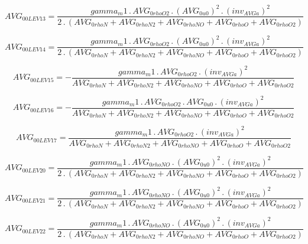 \documentclass{article}
\begin{document}
\begin{dmath}AVG_{0 0 LEV 13} = \frac{gamma_m1 \,.\, AVG_{0 rhoO2} \,.\, \left(AVG_{0 u0} \right)^{2} \,.\, \left(inv_{AVG a} \right)^{2}}{2 \,.\, \left(AVG_{0 rhoN} + AVG_{0 rhoN2} + AVG_{0 rhoNO} + AVG_{0 rhoO} + AVG_{0 rhoO2}\right)}\end{dmath}

\begin{dmath}AVG_{0 0 LEV 14} = \frac{gamma_m1 \,.\, AVG_{0 rhoO2} \,.\, \left(AVG_{0 u0} \right)^{2} \,.\, \left(inv_{AVG a} \right)^{2}}{2 \,.\, \left(AVG_{0 rhoN} + AVG_{0 rhoN2} + AVG_{0 rhoNO} + AVG_{0 rhoO} + AVG_{0 rhoO2}\right)}\end{dmath}

\begin{dmath}AVG_{0 0 LEV 15} = - \frac{gamma_m1 \,.\, AVG_{0 rhoO2} \,.\, \left(inv_{AVG a} \right)^{2}}{AVG_{0 rhoN} + AVG_{0 rhoN2} + AVG_{0 rhoNO} + AVG_{0 rhoO} + AVG_{0 rhoO2}}\end{dmath}

\begin{dmath}AVG_{0 0 LEV 16} = - \frac{gamma_m1 \,.\, AVG_{0 rhoO2} \,.\, AVG_{0 u0} \,.\, \left(inv_{AVG a} \right)^{2}}{AVG_{0 rhoN} + AVG_{0 rhoN2} + AVG_{0 rhoNO} + AVG_{0 rhoO} + AVG_{0 rhoO2}}\end{dmath}

\begin{dmath}AVG_{0 0 LEV 17} = \frac{gamma_m1 \,.\, AVG_{0 rhoO2} \,.\, \left(inv_{AVG a} \right)^{2}}{AVG_{0 rhoN} + AVG_{0 rhoN2} + AVG_{0 rhoNO} + AVG_{0 rhoO} + AVG_{0 rhoO2}}\end{dmath}

\begin{dmath}AVG_{0 0 LEV 20} = \frac{gamma_m1 \,.\, AVG_{0 rhoNO} \,.\, \left(AVG_{0 u0} \right)^{2} \,.\, \left(inv_{AVG a} \right)^{2}}{2 \,.\, \left(AVG_{0 rhoN} + AVG_{0 rhoN2} + AVG_{0 rhoNO} + AVG_{0 rhoO} + AVG_{0 rhoO2}\right)}\end{dmath}

\begin{dmath}AVG_{0 0 LEV 21} = \frac{gamma_m1 \,.\, AVG_{0 rhoNO} \,.\, \left(AVG_{0 u0} \right)^{2} \,.\, \left(inv_{AVG a} \right)^{2}}{2 \,.\, \left(AVG_{0 rhoN} + AVG_{0 rhoN2} + AVG_{0 rhoNO} + AVG_{0 rhoO} + AVG_{0 rhoO2}\right)}\end{dmath}

\begin{dmath}AVG_{0 0 LEV 22} = \frac{gamma_m1 \,.\, AVG_{0 rhoNO} \,.\, \left(AVG_{0 u0} \right)^{2} \,.\, \left(inv_{AVG a} \right)^{2}}{2 \,.\, \left(AVG_{0 rhoN} + AVG_{0 rhoN2} + AVG_{0 rhoNO} + AVG_{0 rhoO} + AVG_{0 rhoO2}\right)}\end{dmath}
\end{document}
